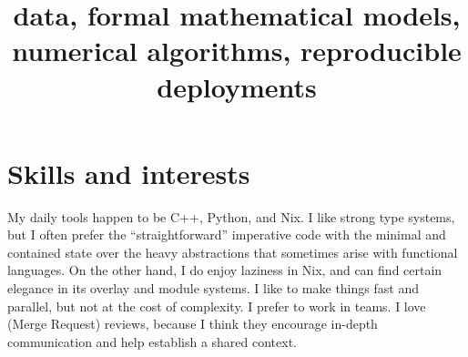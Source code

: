 \documentclass[10pt,a4paper]{moderncv}
\title{data, formal mathematical models, numerical algorithms, reproducible deployments}
\begin{document}
\maketitle

\section{Skills and interests}

My daily tools happen to be C++, Python, and Nix.
I like strong type systems, but I often prefer the ``straightforward''
imperative code with the minimal and contained state over the heavy
abstractions that sometimes arise with functional languages. On the other hand,
I do enjoy laziness in Nix, and can find certain elegance in its overlay and
module systems. I like to make things fast and parallel, but not at the cost of
complexity. I prefer to work in teams. I love (Merge Request) reviews, because
I think they encourage in-depth communication and help establish a shared
context.
\end{document}
